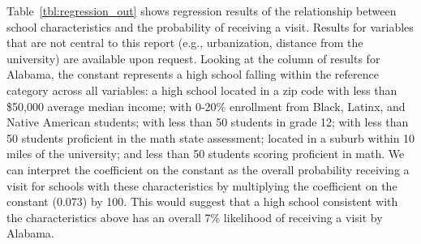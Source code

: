 \documentclass[twoside]{article}
\begin{document}
Table~\ref{tbl:regression_out} shows regression results of the relationship between school characteristics and the probability of receiving a visit. Results for variables that are not central to this report (e.g., urbanization, distance from the university) are available upon request. Looking at the column of results for Alabama, the constant represents a high school falling within the reference category across all variables: a high school located in a zip code with less than \$50,000 average median income; with 0-20\% enrollment from Black, Latinx, and Native American students; with less than 50 students in grade 12; with less than 50 students proficient in the math state assessment; located in a suburb within 10 miles of the university; and less than 50 students scoring proficient in math.  We can interpret the coefficient on the constant as the overall probability receiving a visit for schools with these characteristics by multiplying the coefficient on the constant (0.073) by 100. This would suggest that a high school consistent with the characteristics above has an overall 7\% likelihood of receiving a visit by Alabama.



\end{document}
